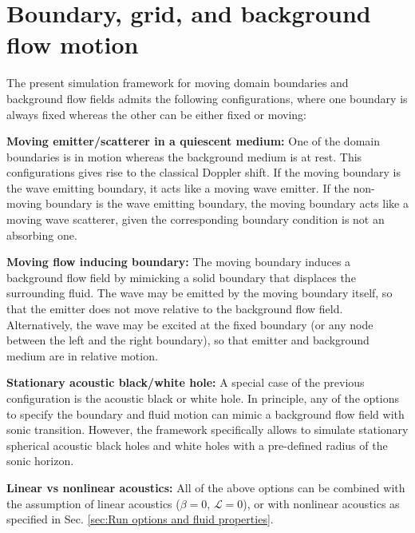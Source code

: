 \section{Boundary, grid, and background flow motion}
\label{sec:Boundary, grid, and background flow motion}

The present simulation framework for moving domain boundaries and background flow fields admits the following configurations, where one boundary is always fixed whereas the other can be either fixed or moving:
\begin{compactitem}
\item \textbf{Moving emitter/scatterer in a quiescent medium:} One of the domain boundaries is in motion whereas the background medium is at rest. This configurations gives rise to the classical Doppler shift. If the moving boundary is the wave emitting boundary, it acts like a moving wave emitter. If the non-moving boundary is the wave emitting boundary, the moving boundary acts like a moving wave scatterer, given the corresponding boundary condition is not an absorbing one.
\item \textbf{Moving flow inducing boundary:} The moving boundary induces a background flow field by mimicking a solid boundary that displaces the surrounding fluid. The wave may be emitted by the moving boundary itself, so that the emitter does not move relative to the background flow field. Alternatively, the wave may be excited at the fixed boundary (or any node between the left and the right boundary), so that emitter and background medium are in relative motion.
\item \textbf{Stationary acoustic black/white hole:} A special case of the previous configuration is the acoustic black or white hole. In principle, any of the options to specify the boundary and fluid motion can mimic a background flow field with sonic transition. However, the framework specifically allows to simulate stationary spherical acoustic black holes and white holes with a pre-defined radius of the sonic horizon.
\item \textbf{Linear vs nonlinear acoustics:} All of the above options can be combined with the assumption of linear acoustics ($\beta=0$, $\mathcal{L}=0$), or with nonlinear acoustics as specified in Sec. \ref{sec:Run options and fluid properties}.
\end{compactitem}

